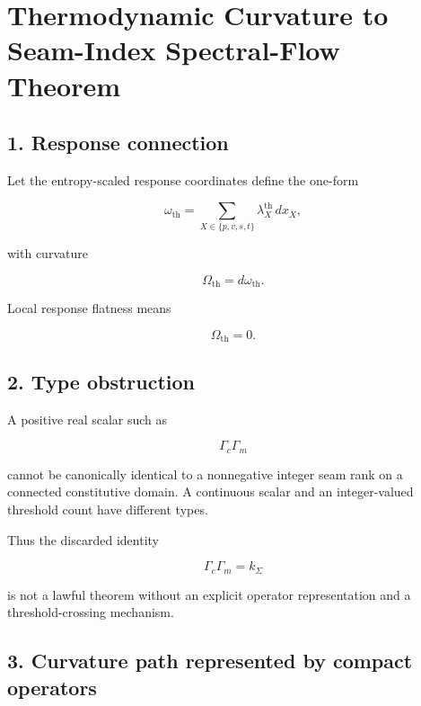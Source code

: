 \hypertarget{thermodynamic-curvature-to-seam-index-spectral-flow-theorem}{%
\chapter{Thermodynamic Curvature to Seam-Index Spectral-Flow Theorem}\label{thermodynamic-curvature-to-seam-index-spectral-flow-theorem}}

\hypertarget{response-connection}{%
\section{1. Response connection}\label{response-connection}}

Let the entropy-scaled response coordinates define the one-form

\[
\omega_{\mathrm{th}}
=\sum_{X\in\{p,v,s,t\}}
\lambda_X^{\mathrm{th}}\,dx_X,
\]

with curvature

\[
\boxed{
\Omega_{\mathrm{th}}=d\omega_{\mathrm{th}}.
}
\]

Local response flatness means

\[
\Omega_{\mathrm{th}}=0.
\]

\hypertarget{type-obstruction}{%
\section{2. Type obstruction}\label{type-obstruction}}

A positive real scalar such as

\[
\Gamma_c\Gamma_m
\]

cannot be canonically identical to a nonnegative integer seam rank on a connected constitutive domain. A continuous scalar and an integer-valued threshold count have different types.

Thus the discarded identity

\[
\Gamma_c\Gamma_m=k_\Sigma
\]

is not a lawful theorem without an explicit operator representation and a threshold-crossing mechanism.

\hypertarget{curvature-path-represented-by-compact-operators}{%
\section{3. Curvature path represented by compact operators}\label{curvature-path-represented-by-compact-operators}}

